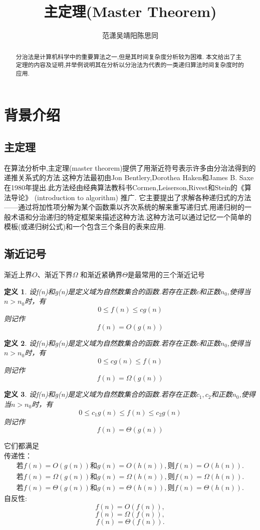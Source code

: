 \documentclass[a4paper]{article}%
\title{主定理(Master Theorem)}%
\author{范潇\phantom{1}吴靖阳\phantom{1}陈思同}%
\date{}%
\newtheorem{definiton}{定义}
\begin{document}
  \maketitle  
\begin{abstract}
    分治法是计算机科学中的重要算法之一,但是其时间复杂度分析较为困难.
    本文给出了主定理的内容及证明,并举例说明其在分析以分治法为代表的一类递归算法时间复杂度时的应用.
\end{abstract}
\section{背景介绍}
\subsection{主定理}
在算法分析中,主定理(master theorem)提供了用渐近符号表示许多由分治法得到的递推关系式的方法.这种方法最初由Jon Bentlery,Dorothea Haken和James B. Saxe在1980年提出.此方法经由经典算法教科书Cormen,Leiserson,Rivest和Stein的《算法导论》 (introduction to algorithm) 推广.
它主要提出了求解各种递归式的方法——通过将加性项分解为某个函数乘以齐次系统的解来重写递归式.用递归树的一般术语和分治递归的特定框架来描述这种方法.这种方法可以通过记忆一个简单的模板(或递归树公式)和一个包含三个条目的表来应用.
\subsection{渐近记号}
渐近上界$O$、渐近下界$\Omega$ 和渐近紧确界$\Theta $是最常用的三个渐近记号
\begin{definiton}
    设f(n)和g(n)是定义域为自然数集合的函数.若存在正数$c$和正数$n_0$,使得当$n>n_0$时，有
    \[0\le f(n)\le cg(n)\]
    则记作
    \[f(n)=O(g(n))\]
    \end{definiton}
\begin{definiton}
    设f(n)和g(n)是定义域为自然数集合的函数.若存在正数$c$和正数$n_0$,使得当$n>n_0$时，有
    \[0\le cg(n)\le f(n)\]
    则记作
    \[f(n)=\Omega(g(n))\]
    \end{definiton}    
\begin{definiton}
    设f(n)和g(n)是定义域为自然数集合的函数.若存在正数$c_1,c_2$和正数$n_0$,使得当$n>n_0$时，有
    \[0\le c_1g(n)\le f(n)\le c_2g(n)\]
    则记作
    \[f(n)=\Theta(g(n))\]
    \end{definiton}
它们都满足\\
传递性：
\begin{gather*}
\text{若}f(n)=O(g(n))\text{和}g(n)=O(h(n)),\text{则}f(n)=O(h(n)).\\
\text{若}f(n)=\Omega(g(n))\text{和}g(n)=\Omega(h(n)),\text{则}f(n)=\Omega(h(n)).\\
\text{若}f(n)=\Theta(g(n))\text{和}g(n)=\Theta(h(n)),\text{则}f(n)=\Theta(h(n)).
\end{gather*}
自反性:
\[f(n)=O(f(n)),\]
\[f(n)=\Omega(f(n)),\]
\[f(n)=\Theta(f(n)).\]
\end{document}
